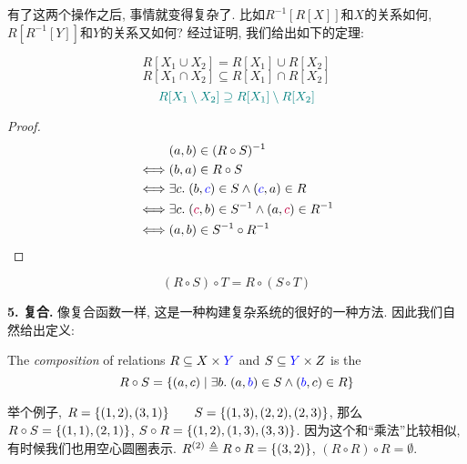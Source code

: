 有了这两个操作之后, 事情就变得复杂了. 比如$R^{-1}[R[X]] $和$ X$的关系如何, $R[R^{-1}[Y]]$和$Y$的关系又如何? 经过证明, 我们给出如下的定理: 
  
\begin{theorem}
  \[
    R[X_1 \cup X_2] = R[X_1] \cup R[X_2]
  \]
  \[
    R[X_1 \cap X_2] \subseteq R[X_1] \cap R[X_2]
  \]
  \[
    \textcolor{teal}{R[X_1 \setminus X_2] \supseteq R[X_1] \setminus R[X_2]}
  \]
\end{theorem}
\begin{proof}
  \setcounter{equation}{0}
  \begin{align*}
    &(a, b) \in (R \circ S)^{-1} \\
    \iff& (b, a) \in R \circ S \\
    \iff& \exists c.\; (b, \textcolor{blue}{c}) \in S \land (\textcolor{blue}{c}, a) \in R \\
    \iff& \exists c.\; (\textcolor{purple}{c}, b) \in S^{-1} \land (a, \textcolor{purple}{c}) \in R^{-1} \\
    \iff& (a, b) \in S^{-1} \circ R^{-1}
  \end{align*}
\end{proof}
\begin{theorem}
  \[
    (R \circ S) \circ T = R \circ (S \circ T)
  \]
\end{theorem}

\textbf{5. 复合. } 像复合函数一样, 这是一种构建复杂系统的很好的一种方法. 因此我们自然给出定义: 
\begin{definition}
  The {\it composition} of relations $R \subseteq X \times \textcolor{blue}{Y}$
  and $S \subseteq \textcolor{blue}{Y} \times Z$ is the 
  \[
    R \circ S = \{(a, c) \mid \exists b.\; (a, \textcolor{blue}{b}) \in S \land (\textcolor{blue}{b}, c) \in R\}
  \]
\end{definition}

举个例子, $R = \{(1, 2), (3, 1)\} \qquad S = \{(1, 3), (2, 2), (2, 3)\}$, 那么$R \circ S = \{(1, 1), (2, 1)\}$, $S \circ R = \{(1, 2), (1, 3), (3, 3)\}$. 因为这个和``乘法''比较相似, 有时候我们也用空心圆圈表示. $R^{(2)} \triangleq R \circ R = \{(3, 2)\}$, $ (R \circ R) \circ R =  \emptyset$. 

